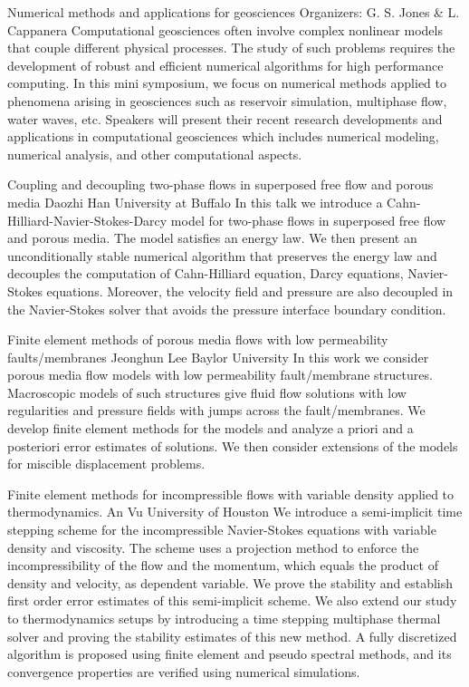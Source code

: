 \label{mini13}

\miniabs
{Numerical methods and applications for geosciences}
{Organizers: G. S. Jones \& L. Cappanera}
{Computational geosciences often involve complex nonlinear models that couple different physical processes. The study of such problems requires the development of robust and efficient numerical algorithms for high performance computing. In this mini symposium, we focus on numerical methods applied to phenomena arising in geosciences such as reservoir simulation, multiphase flow, water waves, etc. Speakers will present their recent research developments and applications in computational geosciences which includes numerical modeling, numerical analysis, and other computational aspects.}

\vspace{2ex}
\abs
{Coupling and decoupling two-phase flows in superposed free flow and porous media}
{Daozhi Han}
{University at Buffalo}
{In this talk we introduce a Cahn-Hilliard-Navier-Stokes-Darcy model for two-phase flows in superposed free flow and porous media. The model satisfies an energy law. We then present an unconditionally stable numerical algorithm that preserves the energy law and decouples the computation of Cahn-Hilliard equation, Darcy equations, Navier-Stokes equations. Moreover, the velocity field and pressure are also decoupled in the Navier-Stokes solver that avoids the pressure interface boundary condition.}


\vspace{1.5ex}
\abs
{Finite element methods of porous media flows with low permeability faults/membranes}
{Jeonghun Lee}
{Baylor University}
{In this work we consider porous media flow models with low permeability fault/membrane structures.
Macroscopic models of such structures give fluid flow solutions with low regularities and pressure fields with jumps across the fault/membranes. We develop finite element methods for the models and analyze a priori and a posteriori error estimates of solutions. We then consider extensions of the models for miscible displacement problems.}


\vspace{1.5ex}
\abs
{Finite element methods for incompressible flows with variable density applied to thermodynamics.}
{An Vu}
{University of Houston}
{We introduce a semi-implicit time stepping scheme for the incompressible Navier-Stokes equations with variable density and viscosity. The scheme uses a projection method to enforce the incompressibility of the flow and the momentum, which equals the product of density and velocity, as dependent variable. We prove the stability and establish first order error estimates of this semi-implicit scheme. We also extend our study to thermodynamics setups by introducing a time stepping multiphase thermal solver and proving the stability estimates of this new method. A fully discretized algorithm is proposed using finite element and pseudo spectral methods, and its convergence properties are verified using numerical simulations.}


